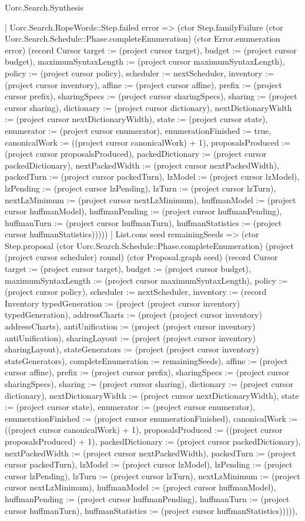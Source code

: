 \begin{lexlean}{Uorc.Search.Synthesis}
\begin{semanticmodule}
{        | Uorc.Search.RopeWords::Step.failed error => (ctor Step.familyFailure (ctor Uorc.Search.Schedule::Phase.completeEnumeration) (ctor Error.enumeration error) (record Cursor {target := (project cursor target), budget := (project cursor budget), maximumSyntaxLength := (project cursor maximumSyntaxLength), policy := (project cursor policy), scheduler := nextScheduler, inventory := (project cursor inventory), affine := (project cursor affine), prefix := (project cursor prefix), sharingSpecs := (project cursor sharingSpecs), sharing := (project cursor sharing), dictionary := (project cursor dictionary), nextDictionaryWidth := (project cursor nextDictionaryWidth), state := (project cursor state), enumerator := (project cursor enumerator), enumerationFinished := true, canonicalWork := ((project cursor canonicalWork) + 1), proposalsProduced := (project cursor proposalsProduced), packedDictionary := (project cursor packedDictionary), nextPackedWidth := (project cursor nextPackedWidth), packedTurn := (project cursor packedTurn), lzModel := (project cursor lzModel), lzPending := (project cursor lzPending), lzTurn := (project cursor lzTurn), nextLzMinimum := (project cursor nextLzMinimum), huffmanModel := (project cursor huffmanModel), huffmanPending := (project cursor huffmanPending), huffmanTurn := (project cursor huffmanTurn), huffmanStatistics := (project cursor huffmanStatistics)}))))
      | List.cons seed remainingSeeds => (ctor Step.proposal (ctor Uorc.Search.Schedule::Phase.completeEnumeration) (project (project cursor scheduler) round) (ctor Proposal.graph seed) (record Cursor {target := (project cursor target), budget := (project cursor budget), maximumSyntaxLength := (project cursor maximumSyntaxLength), policy := (project cursor policy), scheduler := nextScheduler, inventory := (record Inventory {typedGeneration := (project (project cursor inventory) typedGeneration), addressCharts := (project (project cursor inventory) addressCharts), antiUnification := (project (project cursor inventory) antiUnification), sharingLayout := (project (project cursor inventory) sharingLayout), stateGenerators := (project (project cursor inventory) stateGenerators), completeEnumeration := remainingSeeds}), affine := (project cursor affine), prefix := (project cursor prefix), sharingSpecs := (project cursor sharingSpecs), sharing := (project cursor sharing), dictionary := (project cursor dictionary), nextDictionaryWidth := (project cursor nextDictionaryWidth), state := (project cursor state), enumerator := (project cursor enumerator), enumerationFinished := (project cursor enumerationFinished), canonicalWork := ((project cursor canonicalWork) + 1), proposalsProduced := ((project cursor proposalsProduced) + 1), packedDictionary := (project cursor packedDictionary), nextPackedWidth := (project cursor nextPackedWidth), packedTurn := (project cursor packedTurn), lzModel := (project cursor lzModel), lzPending := (project cursor lzPending), lzTurn := (project cursor lzTurn), nextLzMinimum := (project cursor nextLzMinimum), huffmanModel := (project cursor huffmanModel), huffmanPending := (project cursor huffmanPending), huffmanTurn := (project cursor huffmanTurn), huffmanStatistics := (project cursor huffmanStatistics)})))),
}
\end{semanticmodule}
\end{lexlean}
